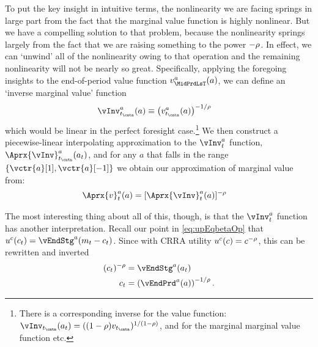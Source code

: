 To put the key insight in intuitive terms, the nonlinearity we are facing springs in large part from the fact that the marginal value function is highly nonlinear.  But we have a compelling solution to that problem, because the nonlinearity springs largely from the fact that we are raising something to the power $-\rho$.  In effect, we can `unwind' all of the nonlinearity owing to that operation and the remaining nonlinearity will not be nearly so great.  Specifically, applying the foregoing insights to the end-of-period value function $\vFunc^{{a}}_{\MidPrdLsT}(\aNrm)$, we can define an `inverse marginal value' function
\begin{equation}\begin{gathered}\begin{aligned}
      \vInv_{\prd_\cntn}^{a}({a})  & \equiv  \left(\vFunc^{{a}}_{\prd_\cntn}({a})\right)^{-1/\CRRA} \label{eq:cGoth}
    \end{aligned}\end{gathered}\end{equation}
which would be linear in the perfect foresight case.\footnote{There is a corresponding inverse for the value function: $\vInv_{\prd_\cntn}({a}_{\prd})=((1-\CRRA)\vFunc_{\prd_\cntn})^{1/(1-\CRRA)}$, and for the marginal marginal value function etc.}  We then construct a piecewise-linear interpolating approximation to the $\vInv_{\prd}^{a}$ function, $\Aprx{\vInv}_{\prd_\cntn}^{a}({a}_{\prd})$, and for any ${a}$ that falls in the range $\{\vctr{a}[1],\vctr{a}[-1]\}$ we obtain our approximation of marginal value from:
\begin{equation}\begin{gathered}\begin{aligned}
      \Aprx{\vFunc}_{\prd}^{a}({a}) & =
      [\Aprx{\vInv}_{\prd}^{a}({a})]^{-\CRRA}
    \end{aligned}\end{gathered}\end{equation}

The most interesting thing about all of this, though, is that the $\vInv^{a}_{\prd}$ function has another interpretation. Recall our point in \eqref{eq:upEqbetaOp} that $\uFunc^{{c}}({c}_{\prd}) = \vEndStg^{{a}}({m}_{\prd}-{c}_{\prd})$.  Since with CRRA utility $u^{c}({c})=c^{-\rho}$, this can be rewritten
and inverted
\begin{equation}\begin{gathered}\begin{aligned}
      ({c}_{\prd})^{-\CRRA} & = \vEndStg^{{a}}({a}_{\prd})
      \\ {c}_{\prd} & =      \left(\vEndPrd^{{a}}({a})\right)^{-1/\CRRA}.
    \end{aligned}\end{gathered}\end{equation}

